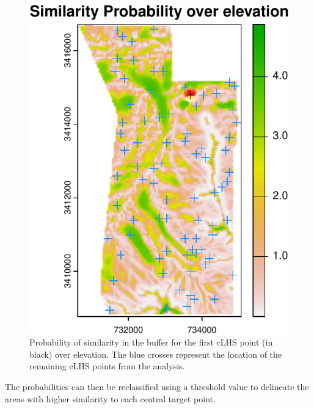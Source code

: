 \documentclass[
  10pt,
  b5paper,
  oneside]{book}
\begin{document}
\begin{figure}
\centering
\includegraphics{Technical-Manual-Soil-Sampling-Design_files/figure-latex/fig-23-1.pdf}
\caption{\label{fig:fig-23}Probability of similarity in the buffer for the first cLHS point (in black) over elevation. The blue crosses represent the location of the remaining cLHS points from the analysis.}
\end{figure}

The probabilities can then be reclassified using a threshold value to delineate the areas with higher similarity to each central target point.
\end{document}
